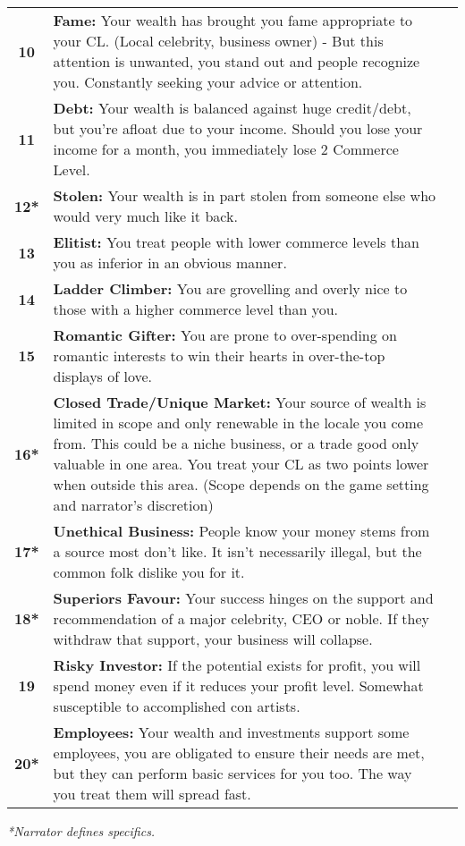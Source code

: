 \begin{center}
\begin{xltabular}{\textwidth}{|c|X|X|}
     \textbf{10} & \textbf{Fame:} Your wealth has brought you fame appropriate to your CL. (Local celebrity, business owner) - But this attention is unwanted, you stand out and people recognize you. Constantly seeking your advice or attention. \\
     \textbf{11} & \textbf{Debt:} Your wealth is balanced against huge credit/debt, but you’re afloat due to your income. Should you lose your income for a month, you immediately lose 2 Commerce Level. \\
     \textbf{12*} & \textbf{Stolen:} Your wealth is in part stolen from someone else who would very much like it back. \\
     \textbf{13} & \textbf{Elitist:} You treat people with lower commerce levels than you as inferior in an obvious manner. \\
     \textbf{14} & \textbf{Ladder Climber:} You are grovelling and overly nice to those with a higher commerce level than you. \\
     \textbf{15} & \textbf{Romantic Gifter:} You are prone to over-spending on romantic interests to win their hearts in over-the-top displays of love. \\
     \textbf{16*} & \textbf{Closed Trade/Unique Market:} Your source of wealth is limited in scope and only renewable in the locale you come from. This could be a niche business, or a trade good only valuable in one area. You treat your CL as two points lower when outside this area. (Scope depends on the game setting and narrator's discretion) \\
     \textbf{17*} & \textbf{Unethical Business:} People know your money stems from a source most don’t like. It isn’t necessarily illegal, but the common folk dislike you for it. \\
     \textbf{18*} & \textbf{Superiors Favour:} Your success hinges on the support and recommendation of a major celebrity, CEO or noble. If they withdraw that support, your business will collapse. \\
     \textbf{19} & \textbf{Risky Investor:} If the potential exists for profit, you will spend money even if it reduces your profit level. Somewhat susceptible to accomplished con artists. \\
     \textbf{20*} & \textbf{Employees:} Your wealth and investments support some employees, you are obligated to ensure their needs are met, but they can perform basic services for you too. The way you treat them will spread fast. \\
     \hline
    \end{xltabular}
\end{center}

\textit{*Narrator defines specifics.}